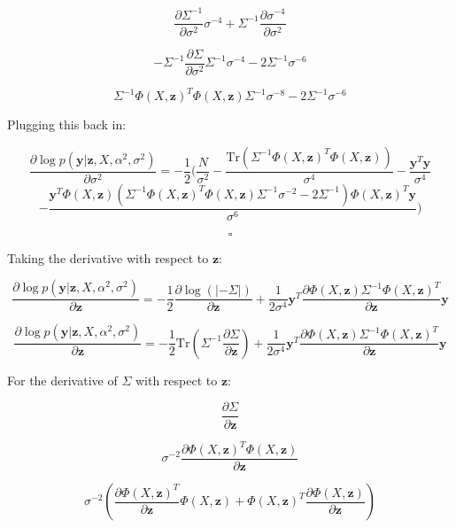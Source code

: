 \documentclass[11pt]{article}
\newcommand{\mbf}[1]{{\boldsymbol{\mathbf{#1}}}}
\renewcommand{\bm}{\mbf}
\newcommand{\Tr}{\textrm{Tr}}
\begin{document}
\begin{enumerate}
\begin{enumerate}[label=(\alph*)]
            $$
            \dfrac{\partial \Sigma^{-1}}{\partial \sigma^2} \sigma^{-4} + \Sigma^{-1} \dfrac{\partial \sigma^{-4}}{\partial \sigma^2}
            $$

            $$
            - \Sigma^{-1} \dfrac{\partial \Sigma}{\partial \sigma^2} \Sigma^{-1} \sigma^{-4} - 2 \Sigma^{-1} \sigma^{-6}
            $$

            $$
            \Sigma^{-1} \Phi(X, \bm{z})^T \Phi(X, \bm{z}) \Sigma^{-1} \sigma^{-8} - 2 \Sigma^{-1} \sigma^{-6}
            $$

            Plugging this back in:

            $$
            \dfrac{\partial \log p(\bm{y}|\bm{z}, X, \alpha^2, \sigma^2)}{\partial \sigma^2} = - \dfrac{1}{2} (\dfrac{N}{\sigma^2} - \dfrac{\Tr(\Sigma^{-1} \Phi(X, \bm{z})^T \Phi(X, \bm{z}))}{\sigma^4} - \dfrac{\bm{y}^T \bm{y}}{\sigma^4}$$$$ - \dfrac{\bm{y}^T \Phi(X, \bm{z}) (\Sigma^{-1} \Phi(X, \bm{z})^T \Phi(X, \bm{z}) \Sigma^{-1} \sigma^{-2} - 2 \Sigma^{-1}) \Phi(X, \bm{z})^T\bm{y}}{\sigma^6})
            $$

            $$\square$$

            Taking the derivative with respect to $\bm{z}$:

            $$
            \dfrac{\partial \log p(\bm{y}|\bm{z}, X, \alpha^2, \sigma^2)}{\partial \bm{z}} = - \dfrac{1}{2} \dfrac{\partial \log(|-\Sigma|)}{\partial \bm{z}} + \dfrac{1}{2 \sigma^4} \bm{y}^T \dfrac{\partial \Phi(X, \bm{z}) \Sigma^{-1} \Phi(X, \bm{z})^T}{\partial \bm{z}} \bm{y}
            $$

            $$
            \dfrac{\partial \log p(\bm{y}|\bm{z}, X, \alpha^2, \sigma^2)}{\partial \bm{z}} = - \dfrac{1}{2} \Tr(\Sigma^{-1} \dfrac{\partial \Sigma}{\partial \bm{z}}) + \dfrac{1}{2 \sigma^4} \bm{y}^T \dfrac{\partial \Phi(X, \bm{z}) \Sigma^{-1} \Phi(X, \bm{z})^T}{\partial \bm{z}} \bm{y}
            $$

            For the derivative of $\Sigma$ with respect to $\bm{z}$:

            $$
            \dfrac{\partial \Sigma}{\partial \bm{z}}
            $$

            $$
            \sigma^{-2} \dfrac{\partial \Phi(X, \bm{z})^T \Phi(X, \bm{z})}{\partial \bm{z}}
            $$

            $$
            \sigma^{-2} (\dfrac{\partial \Phi(X, \bm{z})^T}{\partial \bm{z}} \Phi(X, \bm{z}) + \Phi(X, \bm{z})^T \dfrac{\partial \Phi(X, \bm{z})}{\partial \bm{z}})
            $$


\end{enumerate}
\end{enumerate}
\end{document}
